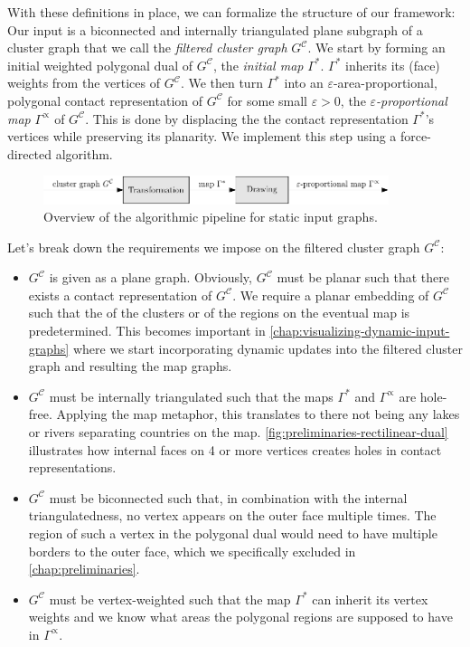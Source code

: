 \newcommand{\clustergraph}[1]{\ensuremath{G^\mathcal{C}_{#1}}}
\newcommand{\initmap}[1]{\ensuremath{\Gamma^*_{#1}}}
\newcommand{\propmap}[1]{\ensuremath{\Gamma^\propto_{#1}}}

With these definitions in place, we can formalize the structure of our framework:
Our input is a biconnected and internally triangulated plane subgraph of a cluster graph that we call the \emph{filtered cluster graph} \clustergraph{}.
We start by forming an initial weighted polygonal dual of \clustergraph{}, the \emph{initial map} \initmap{}.
\initmap{} inherits its (face) weights from the vertices of \clustergraph{}.
We then turn \initmap{} into an $\varepsilon$-area-proportional, polygonal contact representation of \clustergraph{} for some small $\varepsilon > 0$, the \emph{$\varepsilon$-proportional map} \propmap{} of \clustergraph{}.
This is done by displacing the the contact representation \initmap{}'s vertices while preserving its planarity.
We implement this step using a force-directed algorithm.

\begin{figure}[H]
	\centering\includegraphics[width=0.9\textwidth]{Resources/Framework-1.pdf}
	\caption{Overview of the algorithmic pipeline for static input graphs.}
	\label{fig:static-pipeline-thesis}
\end{figure}

Let's break down the requirements we impose on the filtered cluster graph \clustergraph{}:

\begin{itemize}
\item \clustergraph{} is given as a plane graph.
Obviously, \clustergraph{} must be planar such that there exists a contact representation of \clustergraph{}.
We require a planar embedding of \clustergraph{} such that the  of the clusters or of the regions on the eventual map is predetermined.
This becomes important in \cref{chap:visualizing-dynamic-input-graphs} where we start incorporating dynamic updates into the filtered cluster graph and resulting the map graphs.
\item \clustergraph{} must be internally triangulated such that the maps \initmap{} and \propmap{} are hole-free.
Applying the map metaphor, this translates to there not being any lakes or rivers separating countries on the map.
\cref{fig:preliminaries-rectilinear-dual} illustrates how internal faces on 4 or more vertices creates holes in contact representations.
\item \clustergraph{} must be biconnected such that, in combination with the internal triangulatedness, no vertex appears on the outer face multiple times.
The region of such a vertex in the polygonal dual would need to have multiple borders to the outer face, which we specifically excluded in \cref{chap:preliminaries}.
\item \clustergraph{} must be vertex-weighted such that the map \initmap{} can inherit its vertex weights and we know what areas the polygonal regions are supposed to have in \propmap{}.
\end{itemize}

